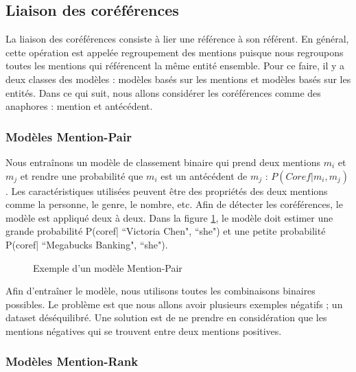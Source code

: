 \documentclass{KodeBook}
\begin{document}
\subsection{Liaison des coréférences}

La liaison des coréférences consiste à lier une référence à son référent. 
En général, cette opération est appelée regroupement des mentions puisque nous regroupons toutes les mentions qui référencent la même entité ensemble. 
Pour ce faire, il y a deux classes des modèles : modèles basés sur les mentions et modèles basés sur les entités. 
Dans ce qui suit, nous allons considérer les coréférences comme des anaphores : mention et antécédent.

\subsubsection{Modèles Mention-Pair}

Nous entraînons un modèle de classement binaire qui prend deux mentions $m_i$ et $m_j$ et rendre une probabilité que $m_i$ est un antécédent de $m_j$ : $P(Coref|m_i, m_j)$. 
Les caractéristiques utilisées peuvent être des propriétés des deux mentions comme la personne, le genre, le nombre, etc.
Afin de détecter les coréférences, le modèle est appliqué deux à deux.
Dans la figure \ref{fig:mention-pair-exp}, le modèle doit estimer une grande probabilité P(coref| ``Victoria Chen", ``she") et une petite probabilité P(coref| ``Megabucks Banking", ``she").

\begin{figure}[ht]
	\centering
	\caption[Exemple d'un modèle Mention-Pair]{Exemple d'un modèle Mention-Pair \cite{2019-jurafsky-martin}}
	\label{fig:mention-pair-exp}
\end{figure}

Afin d'entraîner le modèle, nous utilisons toutes les combinaisons binaires possibles.
Le problème est que nous allons avoir plusieurs exemples négatifs ; un dataset déséquilibré. 
Une solution est de ne prendre en considération que les mentions négatives qui se trouvent entre deux mentions positives.

\subsubsection{Modèles Mention-Rank}
\end{document}
